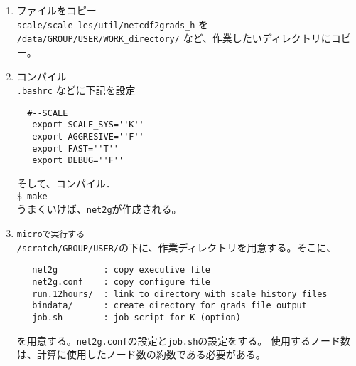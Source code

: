 \begin{enumerate}
\item ファイルをコピー\\
 \verb|scale/scale-les/util/netcdf2grads_h| を \verb|/data/GROUP/USER/WORK_directory/| など、作業したいディレクトリにコピー。
\item コンパイル\\
 \verb|.bashrc| などに下記を設定
 \begin{verbatim}
  #--SCALE
   export SCALE_SYS=''K''
   export AGGRESIVE=''F''
   export FAST=''T''
   export DEBUG=''F''
 \end{verbatim}
 そして、コンパイル．\\
 \verb|$ make|\\
 うまくいけば、\verb|net2g|が作成される。
\item \verb|microで実行する| \\
 \verb|/scratch/GROUP/USER/|の下に、作業ディレクトリを用意する。そこに、
 \begin{verbatim}
   net2g         : copy executive file
   net2g.conf    : copy configure file
   run.12hours/  : link to directory with scale history files
   bindata/      : create directory for grads file output
   job.sh        : job script for K (option)
 \end{verbatim}
 を用意する。\verb|net2g.conf|の設定と\verb|job.sh|の設定をする。
 使用するノード数は、計算に使用したノード数の約数である必要がある。
\end{enumerate}


